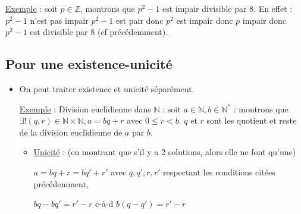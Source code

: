 \documentclass[12pt,a4paper,french]{book}
\begin{document}
\underline{Exemple} : soit $p \in \mathbb{Z}$, montrons que $p^{2}-1$ est impair  divisible par 8. En effet :  $p^2-1$ n'est pas impair  $p^2-1$ est pair donc $p^{2}$ est impair donc $p$ impair donc $p^{2}-1$ est divisible par 8 (cf précédemment).

\subsection{Pour une existence-unicité}
\begin{itemize}
	\item On peut traiter existence et unicité séparément. 
	
	\underline{Exemple} : Division euclidienne dans $\mathbb{N}$ : soit $a \in \mathbb{N}, b \in \mathbb{N}^{\ast}$ : montrons que $\exists ! (q,r) \in \mathbb{N}\times\mathbb{N}, a = bq+r$ avec $0 \leqslant r < b$. $q$ et $r$ sont les quotient et reste de la division euclidienne de $a$ par $b$. 
	\begin{itemize}
		\item \underline{Unicité} : (en montrant que s'il y a 2 solutions, alors elle ne font qu'une)
		
		 $a = bq+r = bq'+r'$ avec $q,q',r,r'$ respectant les conditions citées précédemment, 
		
		 $bq - bq' = r'-r$ c-à-d $b(q-q') = r'-r$ 
		

\end{itemize}
\end{itemize}
\end{document}
